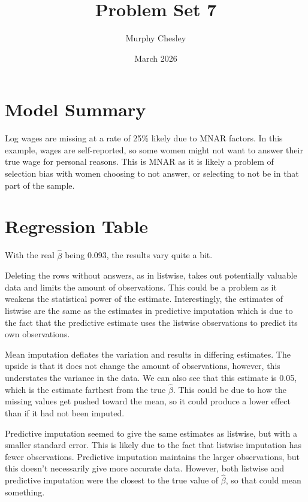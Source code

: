 \documentclass{article}
\title{Problem Set 7}
\author{Murphy Chesley}
\date{March 2026}
\begin{document}
\maketitle

\section{Model Summary}


Log wages are missing at a rate of 25\% likely due to MNAR factors. In this example, wages are self-reported, so some women might not want to answer their true wage for personal reasons. This is MNAR as it is likely a problem of selection bias with women choosing to not answer, or selecting to not be in that part of the sample.


\section{Regression Table}


With the real $\hat{\beta}$ being 0.093, the results vary quite a bit. 

Deleting the rows without answers, as in listwise, takes out potentially valuable data and limits the amount of observations. This could be a problem as it weakens the statistical power of the estimate. Interestingly, the estimates of listwise are the same as the estimates in predictive imputation which is due to the fact that the predictive estimate uses the listwise observations to predict its own observations.

Mean imputation deflates the variation and results in differing estimates. The upside is that it does not change the amount of observations, however, this understates the variance in the data. We can also see that this estimate is 0.05, which is the estimate farthest from the true $\hat{\beta}$. This could be due to how the missing values get pushed toward the mean, so it could produce a lower effect than if it had not been imputed.

Predictive imputation seemed to give the same estimates as listwise, but with a smaller standard error. This is likely due to the fact that listwise imputation has fewer observations. Predictive imputation maintains the larger observations, but this doesn't necessarily give more accurate data. However, both listwise and predictive imputation were the closest to the true value of $\hat{\beta}$, so that could mean something.
\end{document}
